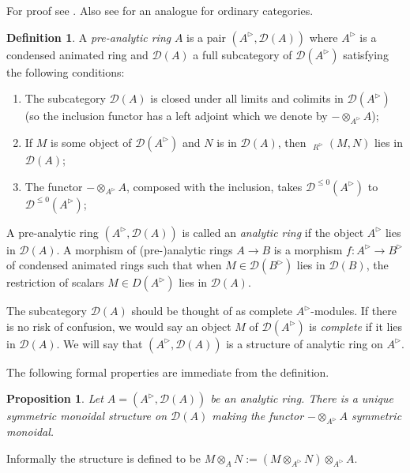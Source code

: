\documentclass{article}
\theoremstyle{plain}
\newtheorem{prop}[thm]{Proposition}
\theoremstyle{definition}
\newtheorem{defi}[thm]{Definition}
\theoremstyle{remark}
\DeclareMathOperator{\rhoms}{\underline{RHom}}
\newcommand{\huflag}{\triangleright}
\newcommand{\D}{\mathcal{D}}
\begin{document}
For proof see \cite{ragimov_infty-categorical_2022}. Also see \cite{adamek_reflections_1989} for an analogue for ordinary categories.

\begin{defi}
A \emph{pre-analytic ring} $ A $ is a pair $ (A ^{\huflag}, \D(A)) $ where $ A ^{\huflag} $ is a condensed animated ring and
$ \D (A) $ a full subcategory of $ \D (A ^{\huflag}) $ satisfying the following conditions:

\begin{enumerate}
\item The subcategory $ \D (A) $ is closed under all limits and colimits in $ \D (A ^{\huflag}) $ 
(so the inclusion functor has a left adjoint which we denote by $ - \otimes _{A ^{\huflag}} A $);
\item If $ M $ is some object of $ \D (A ^{\huflag}) $ and $ N $ is in $\D (A) $, then $ \rhoms _{R ^{\huflag}} (M, N) $ lies in $ \D (A) $;
\item The functor $ -\otimes _{A ^{\huflag}} A $, composed with the inclusion, takes $ \D ^{\leq 0}(A ^{\huflag}) $ to $ \D ^{\leq 0}(A ^{\huflag}) $;
\end{enumerate}
A pre-analytic ring $ (A ^{\huflag}, \D (A)) $ is called an \emph{analytic ring} if
the object $ A ^{\huflag} $ lies in $ \D (A) $.
A morphism of (pre-)analytic rings $ A\to B $ is a morphism $ f: A ^{\huflag}\to B ^{\huflag} $ of condensed animated rings such that when
$ M\in \D (B ^{\huflag}) $ lies in $ \D (B) $, the restriction of scalars $ M \in D (A ^{\huflag}) $ lies in $ \D (A) $.
\end{defi}

The subcategory $ \D (A) $ should be thought of as complete $ A ^{\huflag} $-modules.
If there is no risk of confusion, we would say an object $ M $ of $ \D (A ^{\huflag}) $ is \emph{complete} if it lies in $\D (A) $.
We will say that $ (A ^{\huflag}, \D (A)) $ is a structure of analytic ring on $ A ^{\huflag} $.

The following formal properties are immediate from the definition.
\begin{prop}
Let $ A = (A ^{\huflag}, \D (A)) $ be an analytic ring.
There is a unique symmetric monoidal structure on $ \D (A) $ making the functor $ -\otimes _{A ^{\huflag}} A $ symmetric monoidal.
\end{prop}

Informally the structure is defined to be $ M \otimes _{A} N := (M \otimes _{A ^{\huflag}} N)\otimes _{A ^{\huflag}} A $.
\end{document}

